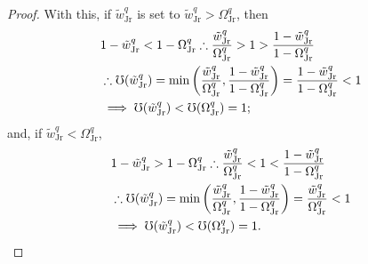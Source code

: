 \documentclass[hidelinks, nonatbib]{elsarticle}
\begin{document}
\begin{lemma}
\begin{proof}
        With this, if $\tilde{w}_{\text{Jr}}^{q}$ is set to $\tilde{w}_{\text{Jr}}^{q} > \Omega_{\text{Jr}}^{q}$, then
        \begin{align}
            &
            1 - \tilde{w}_{\text{Jr}}^{q}
            <
            1 - \Omega_{\text{Jr}}^{q}
            \therefore
            \frac{
                \tilde{w}_{\text{Jr}}^{q}
            }{
                \Omega_{\text{Jr}}^{q}
            }
            >
            1
            >
            \frac{
                1 - \tilde{w}_{\text{Jr}}^{q}
            }{
                1 - \Omega_{\text{Jr}}^{q}
            }
            \\
            &\therefore
            \mho(\tilde{w}_{\text{Jr}}^{q}) 
            =
            \min\left(
                \frac{
                    \tilde{w}_{\text{Jr}}^{q}
                }{
                    \Omega_{\text{Jr}}^{q}
                }
                ,
                \frac{
                    1 - \tilde{w}_{\text{Jr}}^{q}
                }{
                    1 - \Omega_{\text{Jr}}^{q}
                }
            \right)
            =
            \frac{
                1 - \tilde{w}_{\text{Jr}}^{q}
            }{
                1 - \Omega_{\text{Jr}}^{q}
            }
            <
            1
            \\
            &
            \implies
            \mho(\tilde{w}_{\text{Jr}}^{q})
            <
            \mho(\Omega_{\text{Jr}}^{q})
            =
            1
            ;
        \end{align}
        and, if $\tilde{w}_{\text{Jr}}^{q} < \Omega_{\text{Jr}}^{q}$,
        \begin{align}
            &
            1 - \tilde{w}_{\text{Jr}}^{q}
            >
            1 - \Omega_{\text{Jr}}^{q}
            \therefore
            \frac{
                \tilde{w}_{\text{Jr}}^{q}
            }{
                \Omega_{\text{Jr}}^{q}
            }
            <
            1
            <
            \frac{
                1 - \tilde{w}_{\text{Jr}}^{q}
            }{
                1 - \Omega_{\text{Jr}}^{q}
            }
            \\
            &\therefore
            \mho(\tilde{w}_{\text{Jr}}^{q}) 
            =
            \min\left(
                \frac{
                    \tilde{w}_{\text{Jr}}^{q}
                }{
                    \Omega_{\text{Jr}}^{q}
                }
                ,
                \frac{
                    1 - \tilde{w}_{\text{Jr}}^{q}
                }{
                    1 - \Omega_{\text{Jr}}^{q}
                }
            \right)
            =
            \frac{
                \tilde{w}_{\text{Jr}}^{q}
            }{
                \Omega_{\text{Jr}}^{q}
            }
            <
            1
            \\
            &\implies
            \mho(\tilde{w}_{\text{Jr}}^{q})
            <
            \mho(\Omega_{\text{Jr}}^{q})
            =
            1
            .
        \end{align}
        

\end{proof}
\end{lemma}
\end{document}
